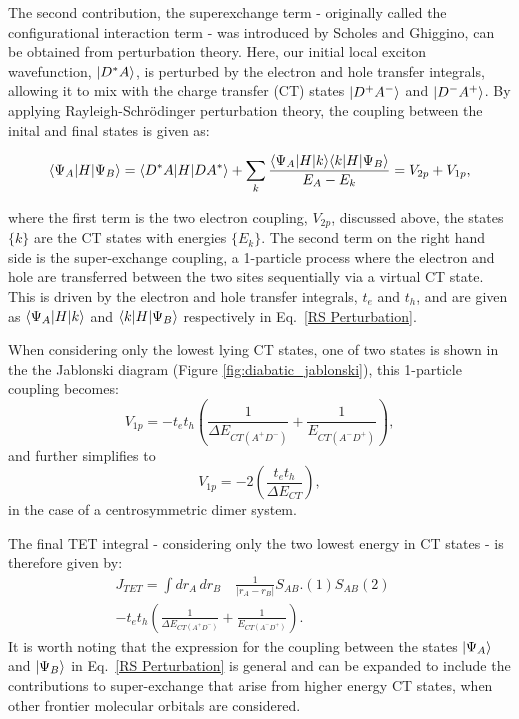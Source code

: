 \documentclass[aps,physrev,reprint,superscriptaddress,nofootinbib,amsmath,amssymb,a4paper]{revtex4-2}
\DeclarePairedDelimiter\bra{\langle}{\rvert}
\DeclarePairedDelimiter\ket{\lvert}{\rangle}
\begin{document}
The second contribution, the superexchange term - originally called the configurational interaction term - was introduced by Scholes and Ghiggino\cite{Scholes1994, OlayaCastro2011, Harcourt1994}, can be obtained from perturbation theory. Here, our initial local exciton wavefunction, $\ket{D^*A}$, is perturbed by the electron and hole transfer integrals, allowing it to mix with the charge transfer (CT) states $\ket{D^+A^-}$ and $\ket{D^-A^+}$. By applying Rayleigh-Schr\"odinger perturbation theory, the coupling between the inital and final states is given as:
\begin{small}
\begin{equation}
        \bra{\Psi_A}{H}\ket{\Psi_B} = \bra{D^*A}H\ket{DA^*} + \sum_{k}\frac{\bra{\Psi_A}H\ket{k}\bra{k}H\ket{\Psi_B}}{E_A-E_k}
  = V_{2p}+V_{1p},       
\label{RS Perturbation}
\end{equation}
\end{small}
where the first term is the two electron coupling, $V_{2p}$, discussed above, the states $\{k\}$ are the CT states with energies $\{E_k\}$. The second term on the right hand side is the super-exchange coupling, a 1-particle process where the electron and hole are transferred between the two sites sequentially via a virtual CT state. This is driven by the electron and hole transfer integrals, $t_e$ and $t_h$, and are given as $\bra{\Psi_A}H\ket{k}$ and $\bra{k}H\ket{\Psi_B}$ respectively in Eq.\ \eqref{RS Perturbation}. 

When considering only the lowest lying CT states, one of two states is shown in the  the Jablonski diagram (Figure \ref{fig:diabatic_jablonski}), this 1-particle coupling becomes:
\begin{equation}
    V_{1p} = -t_et_h\left(\frac{1}{\Delta E_{CT(A^+D^-)}} +\frac{1}{E_{CT(A^-D^+)}}\right),
\end{equation}
and further simplifies to 
\begin{equation}
    V_{1p} = -2\left(\frac{t_et_h}{\Delta E_{CT}}\right) ,
\end{equation}
in the case of a centrosymmetric dimer system. 

The final TET integral - considering only the two lowest energy in CT states - is therefore given by: 
\begin{equation}
\begin{split}
J_{TET}= \int dr_A \, dr_B \quad \frac{1}{|r_A-r_B|} S_{AB}.(1)S_{AB}(2) \quad \\
-t_et_h\left(\frac{1}{\Delta E_{CT(A^+D^-)}} +\frac{1}{E_{CT(A^-D^+)}}\right).
\end{split}
\label{Final_coupling}
\end{equation}
It is worth noting that the expression for the coupling between the states $\ket{\Psi_A}$ and $\ket{\Psi_B}$ in Eq.\ \eqref{RS Perturbation} is general and can be expanded to include the contributions to super-exchange that arise from higher energy CT states, when other frontier molecular orbitals are considered.
\end{document}

